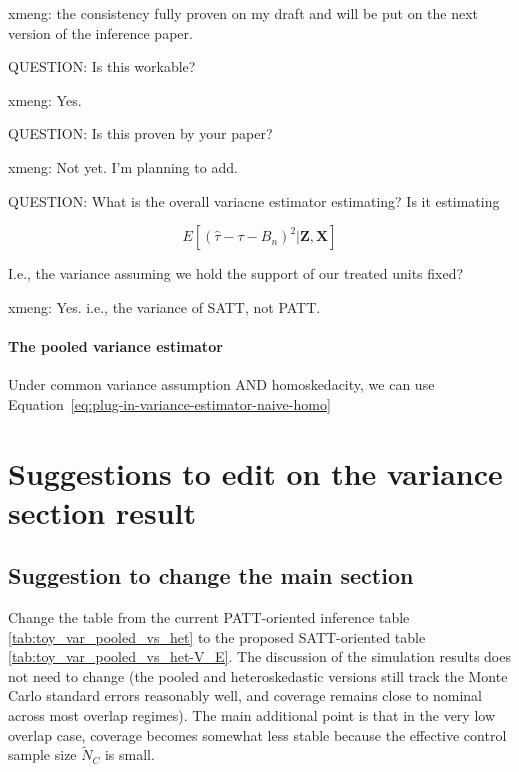 \documentclass[11pt]{article}
\begin{document}
xmeng: the consistency fully proven on my draft and will be put on the next version of the inference paper.


QUESTION: Is this workable? 

xmeng: Yes.

QUESTION: Is this proven by your paper? 

xmeng: Not yet. I'm planning to add.

QUESTION: What is the overall variacne estimator estimating?  Is it estimating 

$$ E[ (\hat{\tau} - \tau - B_n)^2 | \mathbf{Z}, \mathbf{X} ] $$

I.e., the variance assuming we hold the support of our treated units fixed?

xmeng: Yes. i.e., the variance of SATT, not PATT.



\paragraph{The pooled variance estimator} Under common variance assumption AND homoskedacity, we can use Equation~\ref{eq:plug-in-variance-estimator-naive-homo}



\section{Suggestions to edit on the variance section result }

\subsection{Suggestion to change the main section}

Change the table from the current PATT-oriented inference table \ref{tab:toy_var_pooled_vs_het} to the proposed SATT-oriented table \ref{tab:toy_var_pooled_vs_het-V_E}. The discussion of the simulation results does not need to change (the pooled and heteroskedastic versions still track the Monte Carlo standard errors reasonably well, and coverage remains close to nominal across most overlap regimes). The main additional point is that in the very low overlap case, coverage becomes somewhat less stable because the effective control sample size $\tilde{N}_C$ is small.
\end{document}
